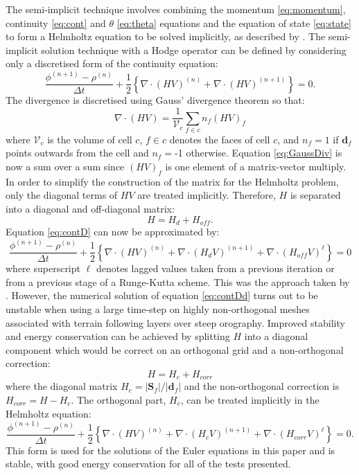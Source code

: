 The semi-implicit technique involves combining the momentum \ref{eq:momentum},
continuity \ref{eq:cont} and $\theta$ \ref{eq:theta} equations
and the equation of state \ref{eq:state} to form a Helmholtz equation
to be solved implicitly, as described by \citet{weller-shahrokhi2014}.
The semi-implicit solution technique with a Hodge operator can be
defined by considering only a discretised form of the continuity equation:
\begin{equation}
\frac{\phi^{(n+1)}-\rho^{(n)}}{\Delta t}+\frac{1}{2}\left\{ \nabla\cdot(HV)^{(n)}+\nabla\cdot(HV)^{(n+1)}\right\} =0.\label{eq:contD}
\end{equation}
The divergence is discretised using Gauss' divergence theorem so that:
\begin{equation}
\nabla\cdot\left(HV\right)=\frac{1}{\mathcal{V}_{c}}\sum_{f\in c}n_{f}(HV)_{f}\label{eq:GaussDiv}
\end{equation}
where $\mathcal{V}_{c}$ is the volume of cell $c$, $f\in c$ denotes
the faces of cell $c$, and $n_{f}=1$ if $\mathbf{d}_{f}$ points
outwards from the cell and $n_{f}=$-1 otherwise. Equation \ref{eq:GaussDiv}
is now a sum over a sum since $(HV)_{f}$ is one element of a matrix-vector
multiply. In order to simplify the construction of the matrix for
the Helmholtz problem, only the diagonal terms of $HV$ are treated
implicitly. Therefore, $H$ is separated into a diagonal and off-diagonal
matrix:
\begin{equation}
H=H_{d}+H_{off}.
\end{equation}
Equation \ref{eq:contD} can now be approximated by:
\begin{equation}
\frac{\phi^{(n+1)}-\rho^{(n)}}{\Delta t}+\frac{1}{2}\left\{ \nabla\cdot(HV)^{(n)}+\nabla\cdot(H_{d}V)^{(n+1)}+\nabla\cdot(H_{off}V)^{\ell}\right\} =0\label{eq:contDd}
\end{equation}
where superscript $\ell$ denotes lagged values taken from a previous
iteration or from a previous stage of a Runge-Kutta scheme. This was
the approach taken by \citet{weller-shahrokhi2014}. However, the
numerical solution of equation \ref{eq:contDd} turns out to be unstable
when using a large time-step on highly non-orthogonal meshes associated
with terrain following layers over steep orography. Improved stability
and energy conservation can be achieved by splitting $H$ into a diagonal
component which would be correct on an orthogonal grid and a non-orthogonal
correction:
\begin{equation}
H=H_{c}+H_{corr}
\end{equation}
where the diagonal matrix $H_{c}=|\mathbf{S}_{f}|/|\mathbf{d}_{f}|$
and the non-orthogonal correction is $H_{corr}=H-H_{c}$. The orthogonal
part, $H_{c}$, can be treated implicitly in the Helmholtz equation:
\begin{equation}
\frac{\phi^{(n+1)}-\rho^{(n)}}{\Delta t}+\frac{1}{2}\left\{ \nabla\cdot(HV)^{(n)}+\nabla\cdot(H_{c}V)^{(n+1)}+\nabla\cdot(H_{corr}V)^{\ell}\right\} =0.\label{eq:contDc}
\end{equation}
This form is used for the solutions of the Euler equations in this
paper and is stable, with good energy conservation for all of the
tests presented. 

